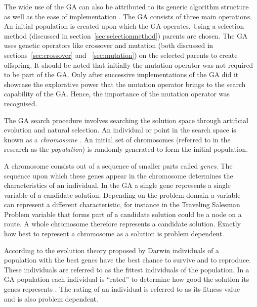 The wide use of the \gls{GA} can also be attributed to its generic algorithm structure as well as the ease of implementation \cite{FamilyGA,AdaptiveSAGA}. The \gls{GA} consists of three main operations. An initial population is created upon which the GA operates. Using a selection method (discussed in section~\ref{sec:selectionmethod}) parents are chosen. The \gls{GA} uses genetic operators like crossover and mutation (both discussed in sections~\ref{sec:crossover} and ~\ref{sec:mutation}) on the selected parents to create offspring\cite{GAGoldberg}. It should be noted that initially the mutation operator was not required to be part of the \gls{GA}. Only after successive implementations of the \gls{GA} did it showcase the explorative power that the mutation operator brings to the search capability of the \gls{GA}. Hence, the importance of the mutation operator was recognised\cite{CompuIntelligenceIntro}. 


The \gls{GA} search procedure involves searching the solution space through artificial evolution and natural selection\cite{FamilyGA,MultiPopGA,HybridIntelliGA}. An individual or point in the search space is known as a \emph{chromosome} \cite{HumanPassiveGA}. An initial set of chromosomes (referred to in the research as the \emph{population}) is randomly generated to form the initial population\cite{FamilyGA,HybridIntelliGA,AcceleratingGA,MultiPopGA}. 

A chromosome consists out of a sequence of smaller parts called \emph{genes}\cite{CompuIntelligenceIntro}. The sequence upon which these genes appear in the chromosome determines the characteristics of an individual\cite{CompuIntelligenceIntro}. In the \gls{GA} a single gene represents a single variable of a candidate solution. Depending on the problem domain a variable can represent a different characteristic, for instance in the Traveling Salesman Problem  variable that forms part of a candidate solution could be a node on a route\cite{FamilyGA,AcceleratingGA}. A whole chromosome therefore represents a candidate solution\cite{FamilyGA,AcceleratingGA}. Exactly how best to represent a chromosome as a solution is problem dependent\cite{CompuIntelligenceIntro}.

According to the evolution theory proposed by Darwin individuals of a population with the best genes have the best chance to survive and to reproduce\cite{CompuIntelligenceIntro}. These individuals are referred to as the fittest individuals of the population. In a \gls{GA} population each individual is ``rated'' to determine how good the solution its genes represents \cite{CompuIntelligenceIntro}. The rating of an individual is referred to as its fitness value and is also problem dependent\cite{CompuIntelligenceIntro}.

